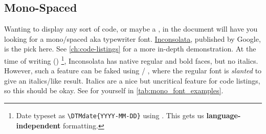 \subsection{Mono-Spaced}
\label{ch:mono-spaced}

Wanting to display any sort of code, or maybe a ,
in the document will have you looking for a mono\-/spaced aka typewriter font.
\href{https://fonts.google.com/specimen/Inconsolata}{Inconsolata}, published by Google,
is the pick here.
See \cref{ch:code-listings} for a more in-depth demonstration.
At the time of writing ()%
\footnote{%
    Date typeset as \texttt{\textbackslash{}DTMdate\{YYYY-MM-DD\}} using
    .
    This gets us \textbf{language-independent}
     formatting.
},
Inconsolata has native regular and bold faces, but no italics.
However, such a feature can be faked using /%
, where the regular font is \emph{slanted} to give an
italics\-/like result.
Italics are a nice but uncritical feature for code listings, so this should be okay.
See for yourself in \cref{tab:mono_font_examples}.

\begin{table}\ContinuedFloat
\end{table}

